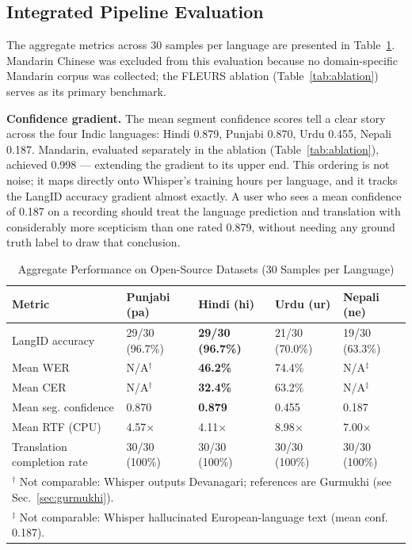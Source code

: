 \documentclass[conference]{IEEEtran}
\begin{document}
\subsection{Integrated Pipeline Evaluation}
\label{sec:largescale}

The aggregate metrics across 30 samples per language are presented in Table~\ref{tab:largescale}. Mandarin Chinese was excluded from this evaluation because no domain-specific Mandarin corpus was collected; the FLEURS ablation (Table~\ref{tab:ablation}) serves as its primary benchmark.

\textbf{Confidence gradient.} The mean segment confidence scores tell a clear story across the four Indic languages: Hindi 0.879, Punjabi 0.870, Urdu 0.455, Nepali 0.187. Mandarin, evaluated separately in the ablation (Table~\ref{tab:ablation}), achieved 0.998 --- extending the gradient to its upper end. This ordering is not noise; it maps directly onto Whisper's training hours per language, and it tracks the LangID accuracy gradient almost exactly. A user who sees a mean confidence of 0.187 on a recording should treat the language prediction and translation with considerably more scepticism than one rated 0.879, without needing any ground truth label to draw that conclusion.

\begin{table}[htbp]
\caption{Aggregate Performance on Open-Source Datasets (30 Samples per Language)}
\label{tab:largescale}
\begin{center}
\begin{tabular}{lllll}
\toprule
\textbf{Metric} & \textbf{Punjabi (pa)} & \textbf{Hindi (hi)} & \textbf{Urdu (ur)} & \textbf{Nepali (ne)} \\
\midrule
LangID accuracy & 29/30 (96.7\%) & \textbf{29/30 (96.7\%)} & 21/30 (70.0\%) & 19/30 (63.3\%) \\
Mean WER & N/A$^\dagger$ & \textbf{46.2\%} & 74.4\% & N/A$^\ddagger$ \\
Mean CER & N/A$^\dagger$ & \textbf{32.4\%} & 63.2\% & N/A$^\ddagger$ \\
Mean seg. confidence & 0.870 & \textbf{0.879} & 0.455 & 0.187 \\
Mean RTF (CPU) & 4.57$\times$ & 4.11$\times$ & 8.98$\times$ & 7.00$\times$ \\
Translation completion rate & 30/30 (100\%) & 30/30 (100\%) & 30/30 (100\%) & 30/30 (100\%) \\
\midrule
\multicolumn{5}{l}{\footnotesize $^\dagger$ Not comparable: Whisper outputs Devanagari; references are Gurmukhi (see Sec.~\ref{sec:gurmukhi}).} \\
\multicolumn{5}{l}{\footnotesize $^\ddagger$ Not comparable: Whisper hallucinated European-language text (mean conf. 0.187).} \\
\bottomrule
\end{tabular}
\end{center}
\end{table}
\end{document}
